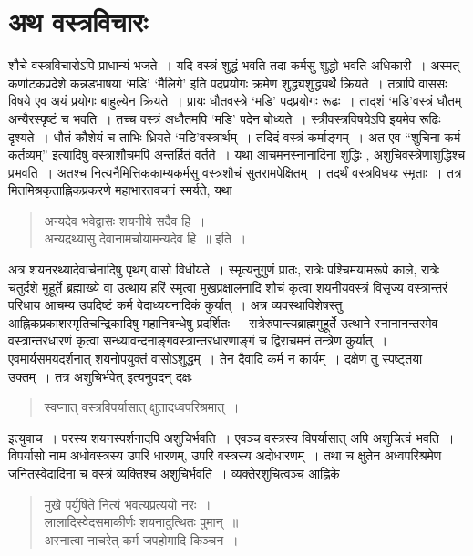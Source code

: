 {\section*{अथ वस्त्रविचारः}

शौचे वस्त्रविचारोऽपि प्राधान्यं भजते~। यदि वस्त्रं शुद्धं भवति तदा कर्मसु शुद्धो भवति अधिकारी~। अस्मत् कर्णाटकप्रदेशे कन्नडभाषया ‘मडि’ ‘मैलिगे’ इति पदप्रयोगः क्रमेण शुद्ध्यशुद्ध्यर्थे क्रियते~। तत्रापि वाससः विषये एव अयं प्रयोगः बाहुल्येन क्रियते~। प्रायः धौतवस्त्रे ‘मडि’ पदप्रयोगः रूढः~। ताद्शं ‘मडि’वस्त्रं धौतम् अन्यैरस्पृष्टं च भवति~। तच्च वस्त्रं अधौतमपि ‘मडि’ पदेन बोध्यते~। स्त्रीवस्त्रविषयेऽपि इयमेव रूढिः दृश्यते~। धौतं कौशेयं च ताभिः ध्रियते ‘मडि’वस्त्रार्थम्~। तदिदं वस्त्रं कर्माङ्गम्~। अत एव “शुचिना कर्म कर्तव्यम्” इत्यादिषु वस्त्राशौचमपि अन्तर्हितं वर्तते~। यथा आचमनस्नानादिना शुद्धिः , अशुचिवस्त्रेणाशुद्धिश्च प्रभवति~। अतश्च नित्यनैमित्तिककाम्यकर्मसु वस्त्रशौचं सुतरामपेक्षितम्~। तदर्थं वस्त्रविधयः स्मृताः~। तत्र मितमिश्रकृताह्निकप्रकरणे महाभारतवचनं स्मर्यते, यथा \enginline{-}
\begin{verse}
अन्यदेव भवेद्वासः शयनीये सदैव हि~। \\
अन्यद्रथ्यासु देवानामर्चायामन्यदेव हि~॥ इति~। 
\end{verse}
अत्र शयनरथ्यादेवार्चनादिषु  पृथग् वासो विधीयते~। स्मृत्यनुगुणं प्रातः, रात्रेः पश्चिमयामरूपे काले, रात्रेः चतुर्दशे मुहूर्ते ब्रह्माख्ये वा उत्थाय हरिं स्मृत्वा मुखप्रक्षालनादि शौचं कृत्वा शयनीयवस्त्रं विसृज्य वस्त्रान्तरं परिधाय आचम्य उपदिष्टं कर्म वेदाध्ययनादिकं कुर्यात्~। अत्र व्यवस्थाविशेषस्तु आह्निकप्रकाशस्मृतिचन्द्रिकादिषु महानिबन्धेषु प्रदर्शितः~। रात्रेरुपान्त्यब्राह्ममुहूर्ते उत्थाने स्नानानन्तरमेव वस्त्रान्तरधारणं कृत्वा सन्ध्यावन्दनाङ्गवस्त्रान्तरधारणाङ्गं च द्विराचमनं तन्त्रेण कुर्यात्~। एवमार्यसमयदर्शनात् शयनोपयुक्तं वासोऽशुद्धम्~। तेन दैवादि कर्म न कार्यम्~। दक्षेण तु स्पष्ट्तया उक्तम्~। तत्र अशुचिर्भवेत् इत्यनुवदन् दक्षः \enginline{-}
\begin{verse}
स्वप्नात् वस्त्रविपर्यासात् क्षुतादध्वपरिश्रमात्~। 
\end{verse}
इत्युवाच~। परस्य शयनस्पर्शनादपि अशुचिर्भवति~। एवञ्च वस्त्रस्य विपर्यासात् अपि अशुचित्वं भवति~। विपर्यासो नाम अधोवस्त्रस्य उपरि धारणम्, उपरि वस्त्रस्य अदोधारणम्~। तथा च क्षुतेन अध्वपरिश्रमेण जनितस्वेदादिना च वस्त्रं व्यक्तिश्च अशुचिर्भवति~। व्यक्तेरशुचित्वञ्च आह्निके 
\begin{verse}
मुखे पर्युषिते नित्यं भवत्यप्रत्ययो नरः~। \\
लालादिस्वेदसमाकीर्णः शयनादुत्थितः पुमान्~॥\\
अस्नात्वा नाचरेत् कर्म जपहोमादि किञ्चन~। 

\end{verse}}
